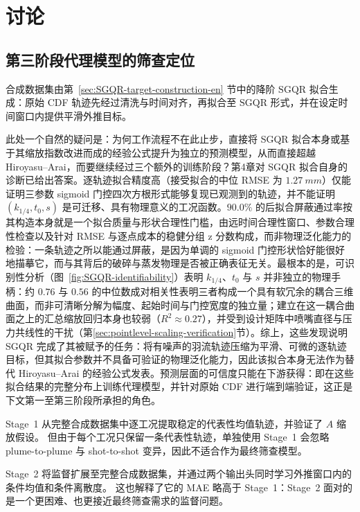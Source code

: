 \section{讨论}

\subsection{第三阶段代理模型的筛查定位}

合成数据集由第~\ref{sec:SGQR-target-construction-en} 节中的降阶 \(\mathrm{SGQR}\) 拟合生成：原始 CDF 轨迹先经过清洗与时间对齐，再拟合至 \(\mathrm{SGQR}\) 形式，并在设定时间窗口内提供平滑外推目标。

此处一个自然的疑问是：为何工作流程不在此止步，直接将 SGQR 拟合本身或基于其缩放指数改进而成的经验公式提升为独立的预测模型，从而直接超越 Hiroyasu--Arai，而要继续经过三个额外的训练阶段？第4章对 SGQR 拟合自身的诊断已给出答案。逐轨迹拟合精度高（接受拟合的中位 RMSE 为 \(\SI{1.27}{mm}\)）仅能证明三参数 sigmoid 门控四次方根形式能够复现已观测到的轨迹，并不能证明 \((k_{1/4},t_0,s)\) 是可迁移、具有物理意义的工况函数。\(90.0\%\) 的后拟合屏蔽通过率按其构造本身就是一个拟合质量与形状合理性门槛，由远时间合理性窗口、参数合理性检查以及针对 RMSE 与逐点成本的稳健分组 z 分数构成，而非物理泛化能力的检验：一条轨迹之所以能通过屏蔽，是因为单调的 sigmoid 门控形状恰好能很好地描摹它，而与其背后的破碎与蒸发物理是否被正确表征无关。最根本的是，可识别性分析（图~\ref{fig:SGQR-identifiability}）表明 \(k_{1/4}\)、\(t_0\) 与 \(s\) 并非独立的物理手柄：约 \(0.76\) 与 \(0.56\) 的中位数成对相关性表明三者构成一个具有软冗余的耦合三维曲面，而非可清晰分解为幅度、起始时间与门控宽度的独立量；建立在这一耦合曲面之上的汇总缩放回归本身也较弱（\(R^2\approx0.27\)），并受到设计矩阵中喷嘴直径与压力共线性的干扰（第\ref{sec:pointlevel-scaling-verification}节）。综上，这些发现说明 SGQR 完成了其被赋予的任务：将有噪声的羽流轨迹压缩为平滑、可微的逐轨迹目标，但其拟合参数并不具备可验证的物理泛化能力，因此该拟合本身无法作为替代 Hiroyasu--Arai 的经验公式发表。预测层面的可信度只能在下游获得：即在这些拟合结果的完整分布上训练代理模型，并针对原始 CDF 进行端到端验证，这正是下文第一至第三阶段所承担的角色。

Stage~1 从完整合成数据集中逐工况提取稳定的代表性均值轨迹，并验证了 $A$ 缩放假设。
但由于每个工况只保留一条代表性轨迹，单独使用 Stage~1 会忽略 plume-to-plume 与 shot-to-shot 变异，因此不适合作为最终筛查模型。

Stage~2 将监督扩展至完整合成数据集，并通过两个输出头同时学习外推窗口内的条件均值和条件离散度。
这也解释了它的 MAE 略高于 Stage~1：Stage~2 面对的是一个更困难、也更接近最终筛查需求的监督问题。

